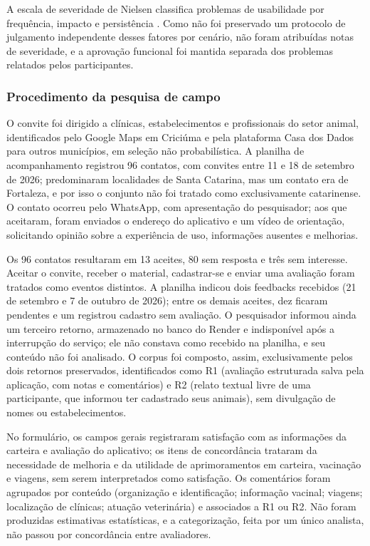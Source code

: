 \documentclass{UNESC}
\begin{document}
A escala de severidade de Nielsen classifica problemas de usabilidade por frequência, impacto e persistência \cite{nielsen1994}. Como não foi preservado um protocolo de julgamento independente desses fatores por cenário, não foram atribuídas notas de severidade, e a aprovação funcional foi mantida separada dos problemas relatados pelos participantes.

\subsubsection{Procedimento da pesquisa de campo}

O convite foi dirigido a clínicas, estabelecimentos e profissionais do setor animal, identificados pelo Google Maps em Criciúma e pela plataforma Casa dos Dados para outros municípios, em seleção não probabilística. A planilha de acompanhamento registrou 96 contatos, com convites entre 11 e 18 de setembro de 2026; predominaram localidades de Santa Catarina, mas um contato era de Fortaleza, e por isso o conjunto não foi tratado como exclusivamente catarinense. O contato ocorreu pelo WhatsApp, com apresentação do pesquisador; aos que aceitaram, foram enviados o endereço do aplicativo e um vídeo de orientação, solicitando opinião sobre a experiência de uso, informações ausentes e melhorias.

Os 96 contatos resultaram em 13 aceites, 80 sem resposta e três sem interesse. Aceitar o convite, receber o material, cadastrar-se e enviar uma avaliação foram tratados como eventos distintos. A planilha indicou dois feedbacks recebidos (21 de setembro e 7 de outubro de 2026); entre os demais aceites, dez ficaram pendentes e um registrou cadastro sem avaliação. O pesquisador informou ainda um terceiro retorno, armazenado no banco do Render e indisponível após a interrupção do serviço; ele não constava como recebido na planilha, e seu conteúdo não foi analisado. O corpus foi composto, assim, exclusivamente pelos dois retornos preservados, identificados como R1 (avaliação estruturada salva pela aplicação, com notas e comentários) e R2 (relato textual livre de uma participante, que informou ter cadastrado seus animais), sem divulgação de nomes ou estabelecimentos.

No formulário, os campos gerais registraram satisfação com as informações da carteira e avaliação do aplicativo; os itens de concordância trataram da necessidade de melhoria e da utilidade de aprimoramentos em carteira, vacinação e viagens, sem serem interpretados como satisfação. Os comentários foram agrupados por conteúdo (organização e identificação; informação vacinal; viagens; localização de clínicas; atuação veterinária) e associados a R1 ou R2. Não foram produzidas estimativas estatísticas, e a categorização, feita por um único analista, não passou por concordância entre avaliadores.
\end{document}
